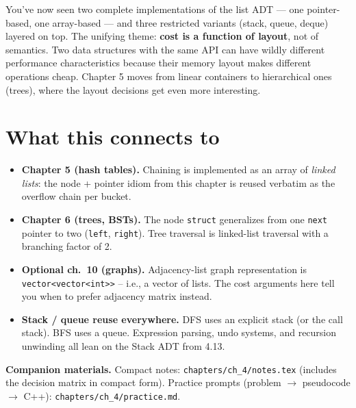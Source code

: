 \documentclass[11pt]{article}
\begin{document}
\begin{ideabox}
You've now seen two complete implementations of the list ADT
--- one pointer-based, one array-based --- and three restricted
variants (stack, queue, deque) layered on top. The unifying
theme: \textbf{cost is a function of layout}, not of semantics.
Two data structures with the same API can have wildly different
performance characteristics because their memory layout makes
different operations cheap. Chapter 5 moves from linear
containers to hierarchical ones (trees), where the layout
decisions get even more interesting.
\end{ideabox}

\section*{What this connects to}

\begin{notebox}
\begin{itemize}
    \item \textbf{Chapter 5 (hash tables).} Chaining is implemented as an
    array of \emph{linked lists}: the node + pointer idiom from this
    chapter is reused verbatim as the overflow chain per bucket.
    \item \textbf{Chapter 6 (trees, BSTs).} The node \texttt{struct}
    generalizes from one \texttt{next} pointer to two (\texttt{left},
    \texttt{right}). Tree traversal is linked-list traversal with a
    branching factor of 2.
    \item \textbf{Optional ch.~10 (graphs).} Adjacency-list graph
    representation is \texttt{vector<vector<int>>} -- i.e., a vector of
    lists. The cost arguments here tell you when to prefer adjacency
    matrix instead.
    \item \textbf{Stack / queue reuse everywhere.} DFS uses an explicit
    stack (or the call stack). BFS uses a queue. Expression parsing, undo
    systems, and recursion unwinding all lean on the Stack ADT from 4.13.
\end{itemize}
\end{notebox}

\textbf{Companion materials.} Compact notes:
\texttt{chapters/ch\_4/notes.tex} (includes the decision matrix in compact
form). Practice prompts (problem $\to$ pseudocode $\to$ C++):
\texttt{chapters/ch\_4/practice.md}.
\end{document}
